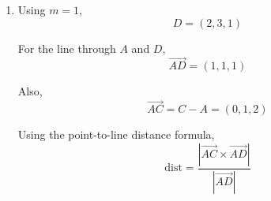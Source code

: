 \documentclass[leqno]{article}
\begin{document}
\begin{enumerate}[
  label=\textbf{\arabic*.},
  leftmargin=*,
  topsep=0pt,
  partopsep=0pt,
  parsep=0pt
]
\begin{tcolorbox}[colback=white, colframe=scarlet, title={\textbf{Solution}}, breakable, grow to left by=6mm, grow to right by=10mm]
\begin{enumerate}[label=\textbf{(\alph*)}]
Hence
\[
\overrightarrow{AD}\times\overrightarrow{BC}=(2-m,\,-2-m,\,2)
\]

Now the scalar triple product is
\begin{align*}
\overrightarrow{AB}\cdot\left(\overrightarrow{AD}\times\overrightarrow{BC}\right)
&=(1,0,0)\cdot(2-m,-2-m,2) \\
&=2-m
\end{align*}

Next,
\begin{align*}
\left\lvert \overrightarrow{AD}\times\overrightarrow{BC}\right\rvert^2
&=(2-m)^2+(-2-m)^2+2^2 \\
&=(m^2-4m+4)+(m^2+4m+4)+4 \\
&=2m^2+12
\end{align*}

So
\[
\left\lvert \overrightarrow{AD}\times\overrightarrow{BC}\right\rvert=\sqrt{2m^2+12}
\]

Therefore the shortest distance is
\[
\frac{|2-m|}{\sqrt{2m^2+12}}
\]

This is given to be \(\dfrac{1}{\sqrt{14}}\), so
\[
\frac{|2-m|}{\sqrt{2m^2+12}}=\frac{1}{\sqrt{14}}
\]

Squaring both sides,
\begin{align*}
14(2-m)^2&=2m^2+12 \\
14(m^2-4m+4)&=2m^2+12 \\
14m^2-56m+56&=2m^2+12 \\
12m^2-56m+44&=0 \\
3m^2-14m+11&=0
\end{align*}

Factorising,
\[
3m^2-14m+11=(3m-11)(m-1)
\]

So
\[
(3m-11)(m-1)=0
\]

Hence
\[
m=\frac{11}{3}\quad \text{or}\quad m=1
\]

Since \(m\) is an integer, the only possible value is
\[
m=1
\]

\item Using \(m=1\),
\[
D=(2,3,1)
\]

For the line through \(A\) and \(D\),
\[
\overrightarrow{AD}=(1,1,1)
\]

Also,
\[
\overrightarrow{AC}=C-A=(0,1,2)
\]

Using the point-to-line distance formula,
\[
\mathrm{dist}=\frac{\left\lvert \overrightarrow{AC}\times\overrightarrow{AD}\right\rvert}{\left\lvert \overrightarrow{AD}\right\rvert}
\]


\end{enumerate}
\end{tcolorbox}
\end{enumerate}
\end{document}
